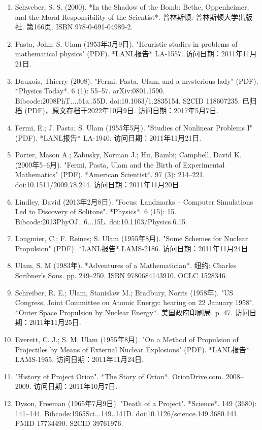 \begin{enumerate}
\item Schweber, S. S. (2000). *In the Shadow of the Bomb: Bethe, Oppenheimer, and the Moral Responsibility of the Scientist*. 普林斯顿: 普林斯顿大学出版社. 第166页. ISBN 978-0-691-04989-2.
\item Pasta, John; S. Ulam (1953年3月9日). "Heuristic studies in problems of mathematical physics" (PDF). *LANL报告* LA-1557. 访问日期：2011年11月21日.
\item Dauxois, Thierry (2008). "Fermi, Pasta, Ulam, and a mysterious lady" (PDF). *Physics Today*. 6 (1): 55–57. arXiv:0801.1590. Bibcode:2008PhT....61a..55D. doi:10.1063/1.2835154. S2CID 118607235. 已归档 (PDF)，原文存档于2022年10月9日. 访问日期：2017年5月7日.
\item Fermi, E.; J. Pasta; S. Ulam (1955年5月). "Studies of Nonlinear Problems I" (PDF). *LANL报告* LA-1940. 访问日期：2011年11月21日.
\item Porter, Mason A.; Zabusky, Norman J.; Hu, Bambi; Campbell, David K. (2009年5–6月). "Fermi, Pasta, Ulam and the Birth of Experimental Mathematics" (PDF). *American Scientist*. 97 (3): 214–221. doi:10.1511/2009.78.214. 访问日期：2011年11月20日.
\item Lindley, David (2013年2月8日). "Focus: Landmarks – Computer Simulations Led to Discovery of Solitons". *Physics*. 6 (15): 15. Bibcode:2013PhyOJ...6...15L. doi:10.1103/Physics.6.15.
\item Longmier, C.; F. Reines; S. Ulam (1955年8月). "Some Schemes for Nuclear Propulsion" (PDF). *LANL报告* LAMS-2186. 访问日期：2011年11月24日.
\item Ulam, S. M (1983年). *Adventures of a Mathematician*. 纽约: Charles Scribner's Sons. pp. 249–250. ISBN 9780684143910. OCLC 1528346.
\item Schreiber, R. E.; Ulam, Stanislaw M.; Bradbury, Norris (1958年). "US Congress, Joint Committee on Atomic Energy: hearing on 22 January 1958". *Outer Space Propulsion by Nuclear Energy*. 美国政府印刷局. p. 47. 访问日期：2011年11月25日.
\item Everett, C. J.; S. M. Ulam (1955年8月). "On a Method of Propulsion of Projectiles by Means of External Nuclear Explosions" (PDF). *LANL报告* LAMS-1955. 访问日期：2011年11月24日.
\item "History of Project Orion". *The Story of Orion*. OrionDrive.com. 2008–2009. 访问日期：2011年10月7日.
\item Dyson, Freeman (1965年7月9日). "Death of a Project". *Science*. 149 (3680): 141–144. Bibcode:1965Sci...149..141D. doi:10.1126/science.149.3680.141. PMID 17734490. S2CID 39761976.

\end{enumerate}
